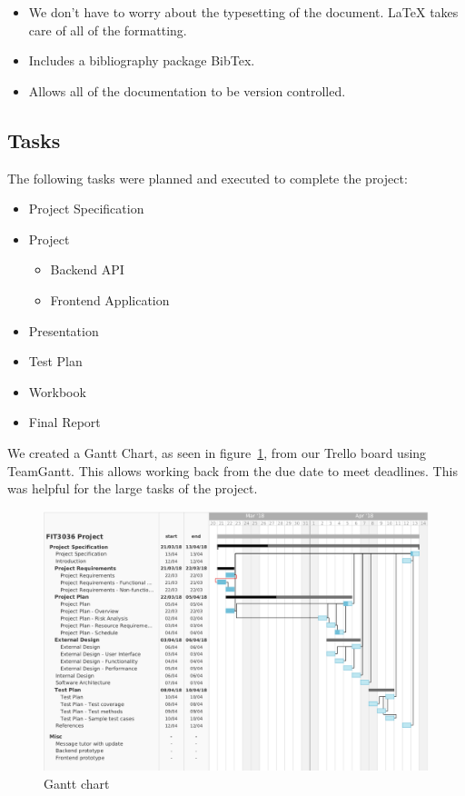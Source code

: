 \documentclass[a4paper,11pt]{article}
\begin{document}
\begin{itemize}
  \item We don't have to worry about the typesetting of the document. \LaTeX{}
    takes care of all of the formatting.
  \item Includes a bibliography package BibTex.
  \item Allows all of the documentation to be version controlled.
\end{itemize}

\subsection{Tasks}

The following tasks were planned and executed to complete the project:

\begin{itemize}
  \item Project Specification
  \item Project
    \begin{itemize}
      \item Backend API
      \item Frontend Application
    \end{itemize}
  \item Presentation
  \item Test Plan
  \item Workbook
  \item Final Report
\end{itemize}

We created a Gantt Chart, as seen in figure~\ref{fig:gantt}, from our Trello
board \autocite{trel:19} using TeamGantt. This allows working back from the
due date to meet deadlines. This was helpful for the large tasks of the project.

\begin{figure}[H]
  \includegraphics[width=\textwidth]{gantt-chart}
  \caption{Gantt chart}\label{fig:gantt}
\end{figure}
\end{document}
